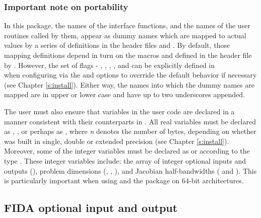 \subsubsection{Important note on portability}

In this package, the names of the interface functions, and the names of
the {\F} user routines called by them, appear as dummy names
which are mapped to actual values by a series of definitions in the
header files  and .
By default, those mapping definitions depend in turn on the {\C} macros
 and  defined in the header file
 by . However,
the set of flags - , ,
, , and
 can be explicitly defined in \\
 when configuring {\sundials} via the 
and  options to override the default behavior if necessary
(see Chapter \ref{s:install}). Either way, the names into which the dummy names
are mapped are in upper or lower case and have up to two underscores appended.

The user must also ensure that variables in the user {\F} code are
declared in a manner consistent with their counterparts in {\ida}.
All real variables must be declared as , ,
or perhaps as , where {\em n} denotes the number of bytes,
depending on whether {\ida} was built in single, double or extended precision 
(see Chapter \ref{s:install}). Moreover, some of the {\F} integer variables
must be declared as  or  according to the 
{\C} type . These integer variables include: the array
of integer optional inputs and outputs (), problem dimensions (,
, ), and Jacobian half-bandwidths ( and ).
This is particularly important when using
{\ida} and the {\fida} package on 64-bit architectures.

\subsection{FIDA optional input and output}

